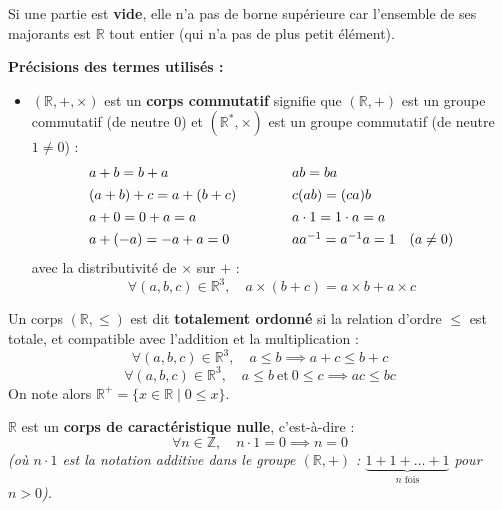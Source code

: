 \documentclass[a4paper,11pt]{article}
\newcommand{\R}{\mathbb{R}}
\newcommand{\Z}{\mathbb{Z}}
\newcommand{\mot}[1]{\textcolor{bordeaux}{\textbf{#1}}}
\begin{document}
\begin{remarque}
Si une partie est \mot{vide}, elle n'a pas de borne supérieure car l'ensemble de ses majorants est $\R$ tout entier (qui n'a pas de plus petit élément).
\end{remarque}

\textbf{Précisions des termes utilisés :}
\begin{itemize}
    \item $(\R, +, \times)$ est un \mot{corps commutatif} signifie que $(\R, +)$ est un groupe commutatif (de neutre $0$) et $(\R^*, \times)$ est un groupe commutatif (de neutre $1 \neq 0$) :
    \[
    \begin{array}{l@{\qquad\qquad}l}
    a + b = b + a & ab = ba \\[4pt]
    (a + b) + c = a + (b + c) & c(ab) = (ca)b \\[4pt]
    a + 0 = 0 + a = a & a \cdot 1 = 1 \cdot a = a \\[4pt]
    a + (-a) = -a + a = 0 & a a^{-1} = a^{-1} a = 1 \quad (a \neq 0)
    \end{array}
    \]
    avec la distributivité de $\times$ sur $+$ :
    \[
    \forall (a, b, c) \in \R^3, \quad a \times (b + c) = a \times b + a \times c
    \]
\end{itemize}

\begin{definition}
Un corps $(\R, \le)$ est dit \mot{totalement ordonné} si la relation d'ordre $\le$ est totale, et compatible avec l'addition et la multiplication :
\[
\forall (a, b, c) \in \R^3, \quad a \le b \implies a + c \le b + c
\]
\[
\forall (a, b, c) \in \R^3, \quad a \le b \ \text{et} \ 0 \le c \implies ac \le bc
\]
On note alors $\R^+ = \{ x \in \R \mid 0 \le x \}$.
\end{definition}

\begin{proposition}[Conséquence]
$\R$ est un \mot{corps de caractéristique nulle}, c'est-à-dire :
\[
\forall n \in \Z, \quad n \cdot 1 = 0 \implies n = 0
\]
\textit{(où $n \cdot 1$ est la notation additive dans le groupe $(\R, +)$ : $\underbrace{1 + 1 + \dots + 1}_{n \text{ fois}}$ pour $n > 0$).}
\end{proposition}
\end{document}

